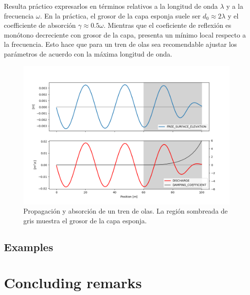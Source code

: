 Resulta práctico expresarlos en términos relativos a la longitud de onda $\lambda$ y a la frecuencia $\omega$. En la práctica, el grosor de la capa esponja suele ser $d_0 \approx 2\lambda$ y el coefficiente de absorción $\gamma \approx 0.5\omega$. Mientras que el coeficiente de reflexión es monótono decreciente con grosor de la capa, presenta un mínimo local respecto a la frecuencia. Esto hace que para un tren de olas sea recomendable ajustar los parámetros de acuerdo con la máxima longitud de onda.


\begin{figure}
    \centering
    \includegraphics[width=.8\textwidth]{img/absorbing_boundary.png}
    \caption{Propagación y absorción de un tren de olas. La región sombreada de gris muestra el grosor de la capa esponja.}
    \label{absorbing_boundary}
\end{figure}


\subsection{Examples}



\section{Concluding remarks}


